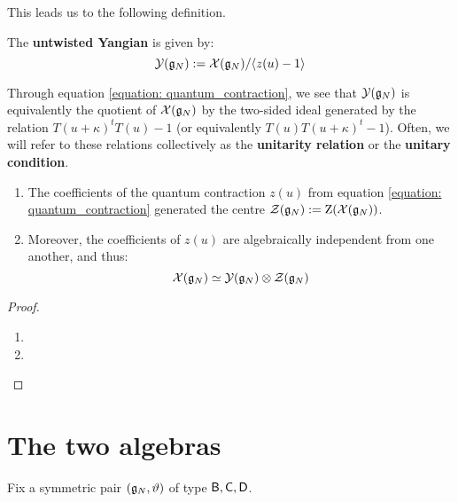             This leads us to the following definition.
            \begin{definition} \label{def: untwisted_yangians}
                The \textbf{untwisted Yangian} is given by:
                    $$\mathcal{Y}(\mathfrak{g}_N) := \mathcal{X}(\mathfrak{g}_N)/\langle z(u) - 1\rangle$$
            \end{definition}
            \begin{remark}[Unitarity]
                Through equation \eqref{equation: quantum_contraction}, we see that $\mathcal{Y}(\mathfrak{g}_N)$ is equivalently the quotient of $\mathcal{X}(\mathfrak{g}_N)$ by the two-sided ideal generated by the relation $T(u + \kappa)^t T(u) - 1$ (or equivalently $T(u) T(u + \kappa)^t - 1$). Often, we will refer to these relations collectively as the \textbf{unitarity relation} or the \textbf{unitary condition}.
            \end{remark}
            \begin{lemma} \label{lemma: centres_of_extended_untwisted_yangians}
                \begin{enumerate}
                    \item The coefficients of the quantum contraction $z(u)$ from equation \eqref{equation: quantum_contraction} generated the centre $\mathcal{Z}(\mathfrak{g}_N) := \mathrm{Z}( \mathcal{X}(\mathfrak{g}_N) )$.
                    \item Moreover, the coefficients of $z(u)$ are algebraically independent from one another, and thus:
                        $$\calX(\g_N) \cong \calY(\g_N) \tensor \calZ(\g_N)$$
                \end{enumerate}
            \end{lemma}
                \begin{proof}
                    \begin{enumerate}
                        \item 
                        \item 
                    \end{enumerate}
                \end{proof}

    \section{The two algebras}
        Fix a symmetric pair $(\mathfrak{g}_N, \vartheta)$ of type $\mathsf{B}, \mathsf{C}, \mathsf{D}$.
        
